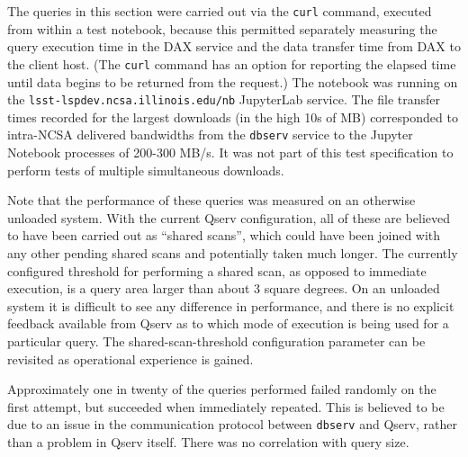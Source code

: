 The queries in this section were carried out via the \verb|curl| command, executed from within a test notebook,
because this permitted separately measuring the query execution time in the DAX service and the data transfer time from DAX to the client host.
(The \verb|curl| command has an option for reporting the elapsed time until data begins to be returned from the request.)
The notebook was running on the \texttt{lsst-lspdev.ncsa.illinois.edu/nb} JupyterLab service.
The file transfer times recorded for the largest downloads (in the high 10s of MB) corresponded to intra-NCSA delivered bandwidths from the \verb|dbserv| service to the Jupyter Notebook processes of 200-300 MB/s.
It was not part of this test specification to perform tests of multiple simultaneous downloads.

Note that the performance of these queries was measured on an otherwise unloaded system.
With the current Qserv configuration, all of these are believed to have been carried out as ``shared scans'',
which could have been joined with any other pending shared scans and potentially taken much longer.
The currently configured threshold for performing a shared scan,
as opposed to immediate execution, is a query area larger than about 3 square degrees.
On an unloaded system it is difficult to see any difference in performance,
and there is no explicit feedback available from Qserv as to which mode of execution is being used for a particular query.
The shared-scan-threshold configuration parameter can be revisited as operational experience is gained.

Approximately one in twenty of the queries performed failed randomly on the first attempt,
but succeeded when immediately repeated.
This is believed to be due to an issue in the communication protocol between \verb|dbserv| and Qserv,
rather than a problem in Qserv itself.
There was no correlation with query size.

